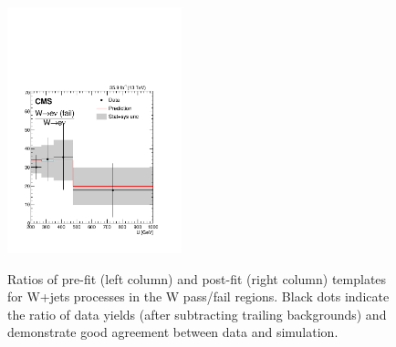\begin{figure}
\includegraphics[width=0.45\textwidth]{figures/pullsImpact/ratio_wen_fail_wen_shapes_fit_b.pdf}\\
\caption{Ratios of pre-fit (left column) and post-fit (right column) templates for W+jets processes in the W pass/fail regions. Black dots indicate the ratio of data yields (after subtracting trailing backgrounds) and demonstrate good agreement between data and simulation.}
\label{wwratios}
\end{figure}

\clearpage

